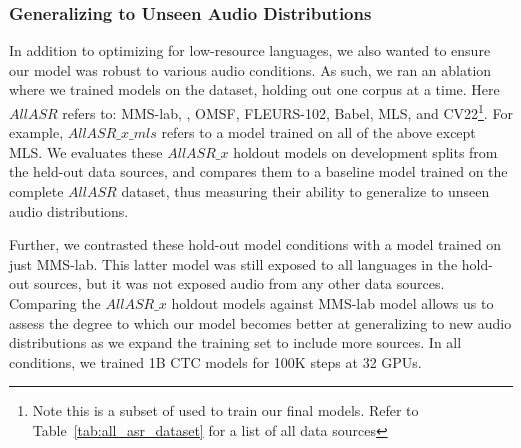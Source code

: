 \subsubsection{Generalizing to Unseen Audio Distributions}
\label{sec:corpus_holdout_ablations}

In addition to optimizing for low-resource languages, we also wanted to ensure our model was robust to various audio conditions. As such, we ran an ablation where we trained models on the \allasr{} dataset, holding out one corpus at a time. Here $AllASR$ refers to: MMS-lab, \vendorcorpus, OMSF, FLEURS-102, Babel, MLS, and CV22\footnote{Note this is a subset of \allasr{} used to train our final models. Refer to Table~\ref{tab:all_asr_dataset} for a list of all data sources}. For example, $AllASR\_x\_mls$ refers to a model trained on all of the above except MLS. We evaluates these $AllASR\_x$ holdout models on development splits from the held-out data sources, and compares them to a baseline model trained on the complete $AllASR$ dataset, thus measuring their ability to generalize to unseen audio distributions. 

Further, we contrasted these hold-out model conditions with a model trained on just MMS-lab. This latter model was still exposed to all languages in the hold-out sources, but it was not exposed audio from any other data sources. Comparing the $AllASR\_x$ holdout models against MMS-lab model allows us to assess the degree to which our model becomes better at generalizing to new audio distributions as we expand the training set to include more sources. In all conditions, we trained 1B CTC models for 100K steps at 32 GPUs.

